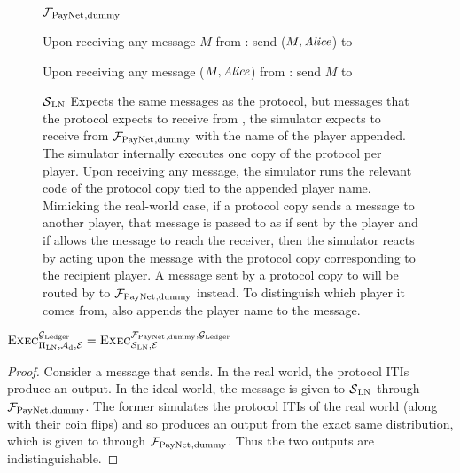 \begin{figure}[H]
  \begin{systembox}{$\mathcal{F}_{\mathrm{PayNet}}{}_{\mathrm{, dummy}}$}
    \begin{algorithmic}[1]
      \State Upon receiving any message $M$ from \alice:
      \Indent
          \State send ($M, \mathit{Alice}$) to \simulator
        \EndIf
      \EndIndent
      \Statex

      \State Upon receiving any message ($M, \mathit{Alice}$) from \simulator:
      \Indent
          \State send $M$ to \alice
        \EndIf
      \EndIndent
    \end{algorithmic}
  \end{systembox}
  \caption{}
  \label{alg:proof:fpaynet:dummy}
\end{figure}

\begin{figure}[H]
  \begin{simulatorbox}{$\mathcal{S}{}_{\mathrm{LN}}$}
    Expects the same messages as the protocol, but messages that the protocol
    expects to receive from \environment, the simulator expects to receive
    from $\mathcal{F}_{\mathrm{PayNet}}{}_{\mathrm{, dummy}}$ with the name of the player appended.
    The simulator internally executes one copy of the protocol per player.
    Upon receiving any message, the simulator runs the relevant code of the
    protocol copy tied to the appended player name. Mimicking the real-world
    case, if a protocol copy sends a message to another player, that message
    is passed to \adversary{} as if sent by the player and if \adversary{}
    allows the message to reach the receiver, then the simulator reacts by
    acting upon the message with the protocol copy corresponding to the
    recipient player. A message sent by a protocol copy to \environment{} will
    be routed by \simulator{} to $\mathcal{F}_{\mathrm{PayNet}}{}_{\mathrm{, dummy}}$ instead. To
    distinguish which player it comes from, \simulator{} also appends the
    player name to the message. 
  \end{simulatorbox}
  \caption{}
  \label{alg:sim:ln}
\end{figure}

\begin{lemma}
  \label{lemma:dummy}
  $\textsc{Exec}^{\mathcal{G}_{\mathrm{Ledger}}}_{\Pi_{\mathrm{LN}}, \mathcal{A}_{\mathrm{d}},
  \mathcal{E}} = \textsc{Exec}^{\mathcal{F}_{\mathrm{PayNet}}{}_{\mathrm{, dummy}},
  \mathcal{G}_{\mathrm{Ledger}}}_{\mathcal{S}_{\mathrm{LN}}, \mathcal{E}}$
\end{lemma}

\begin{proof}
  Consider a message that \environment{} sends. In the real world, the
  protocol ITIs produce an output. In the ideal world, the message is given to
  $\mathcal{S}{}_{\mathrm{LN}}$ through $\mathcal{F}_{\mathrm{PayNet}}{}_{\mathrm{, dummy}}$. The
  former simulates the protocol ITIs of the real world (along with their coin
  flips) and so produces an output from the exact same distribution, which is
  given to \environment{} through $\mathcal{F}_{\mathrm{PayNet}}{}_{\mathrm{, dummy}}$. Thus the
  two outputs are indistinguishable.
\end{proof}
